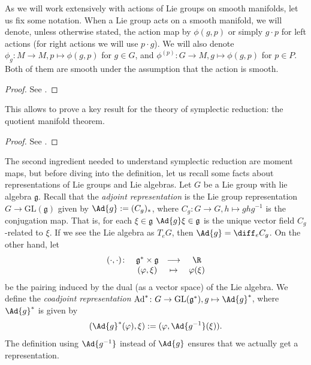As we will work extensively with actions of Lie groups on smooth manifolds, let us fix some notation. When a Lie group acts on a smooth manifold, we will denote, unless otherwise stated, the action map by \(\phi(g,p)\) or simply \(g \cdot p\) for left actions (for right actions we will use \(p \cdot g\)). We will also denote \(\phi_g\colon M \to M, p \mapsto \phi(g,p)\) for \(g \in G\), and \(\phi^{(p)}\colon G \to M, g \mapsto \phi(g,p)\) for \(p \in P\). Both of them are smooth under the assumption that the action is smooth.

\begin{proof}
    See \parencite[Lemma 21.2 and Prop. 21.4]{lee_introSM}.
\end{proof}

This allows to prove a key result for the theory of symplectic reduction: the quotient manifold theorem.

\begin{proof}
    See \parencite[Th. 21.10]{lee_introSM}.
\end{proof}

The second ingredient needed to understand symplectic reduction are moment maps, but before diving into the definition, let us recall some facts about representations of Lie groups and Lie algebras. Let \(G\) be a Lie group with lie algebra \(\mathfrak{g}\). Recall that the \textit{adjoint representation} is the Lie group representation \(G \to \mathrm{GL}(\mathfrak{g})\) given by \(\Ad{g}:=(C_g)_*\), where \(C_g\colon G \to G, h \mapsto ghg^{-1}\) is the conjugation map. That is, for each \(\xi \in \mathfrak{g}\) \(\Ad{g}\xi\in \mathfrak{g}\) is the unique vector field \(C_g\)-related to \(\xi\). If we see the Lie algebra as \(T_eG\), then \(\Ad{g}=\diff_e C_g\). On the other hand, let 
\begin{equation} \label{eq_def_pairing_lie_alg}
\begin{array}{cccc}
    (\cdot, \cdot)\colon & \mathfrak{g}^* \times \mathfrak{g} & \longrightarrow & \R \\
    & (\varphi, \xi) & \mapsto & \varphi(\xi)
\end{array}
\end{equation}
be the pairing induced by the dual (as a vector space) of the Lie algebra. We define the \textit{coadjoint representation} \(\mathrm{Ad}^*\colon G \to \mathrm{GL}(\mathfrak{g}^*), g \mapsto \Ad{g}^*\), where \(\Ad{g}^*\) is given by 
\[
(\Ad{g}^*(\varphi), \xi):=(\varphi, \Ad{g^{-1}}(\xi)).
\]
The definition using \(\Ad{g^{-1}}\) instead of \(\Ad{g}\) ensures that we actually get a representation. \\


